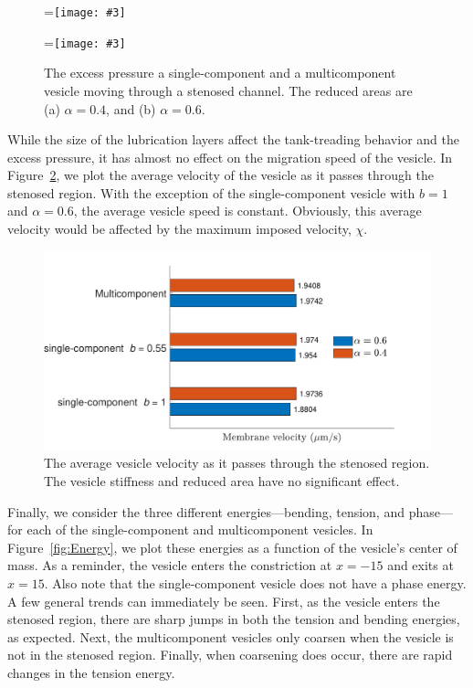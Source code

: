 \documentclass[twoside,twocolumn,9pt]{article}
\newcommand{\subfigimg}[3][,]{%
  \setbox1=\hbox{\texttt{[image: \#3]}}%
  \leavevmode\rlap{\usebox1}%
  \rlap{\hspace*{0pt}\raisebox{\dimexpr\ht1-0\baselineskip}{\bf
  \normalsize #2}}%
  \phantom{\usebox1}%
}
\begin{document}
\begin{figure}[H]
    \centering
    \subfigimg[width = 0.45\columnwidth]{(a)}{figures/Fig10a.pdf}
    \subfigimg[width = 0.45\columnwidth]{(b)}{figures/Fig10b.pdf}
    \caption{\small The excess pressure a single-component and a multicomponent vesicle moving through a stenosed channel. The reduced areas are (a) $\alpha = 0.4$, and (b) $\alpha = 0.6$.}
    \label{fig:excessPressure}
\end{figure}

While the size of the lubrication layers affect the tank-treading behavior and the excess pressure, it has almost no effect on the migration speed of the vesicle. In Figure~\ref{fig:vesVelocity}, we plot the average velocity of the vesicle as it passes through the stenosed region. With the exception of the single-component vesicle with $b=1$ and $\alpha = 0.6$, the average vesicle speed is constant. Obviously, this average velocity would be affected by the maximum imposed velocity, $\chi$.

\begin{figure}[H]
    \centering
    \includegraphics[width=\columnwidth]{figures/Fig9.pdf}
    \caption{\label{fig:vesVelocity} \small The average vesicle velocity as it passes through the stenosed region. The vesicle stiffness and reduced area have no significant effect.}
\end{figure}

Finally, we consider the three different energies---bending, tension, and phase---for each of the single-component and multicomponent vesicles. In Figure~\ref{fig:Energy}, we plot these energies as a function of the vesicle's center of mass. As a reminder, the vesicle enters the constriction at $x=-15$ and exits at $x=15$. Also note that the single-component vesicle does not have a phase energy. A few general trends can immediately be seen. First, as the vesicle enters the stenosed region, there are sharp jumps in both the tension and bending energies, as expected. Next, the multicomponent vesicles only coarsen when the vesicle is not in the stenosed region. Finally, when coarsening does occur, there are rapid changes in the tension energy.
\end{document}
